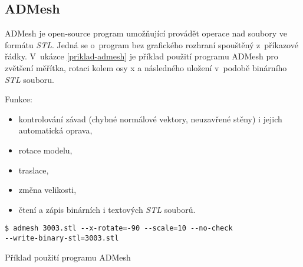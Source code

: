\subsection{ADMesh}
ADMesh \autocite{ADMesh} je open-source program umožňující provádět operace nad soubory ve formátu \textit{\gls{STL}}. Jedná se o~program bez grafického rozhraní spouštěný z~příkazové řádky. V~ukázce \ref{priklad-admesh} je příklad použití programu ADMesh pro zvětšení měřítka, rotaci kolem osy x a následného uložení v~podobě binárního \textit{\gls{STL}} souboru.

Funkce:
\begin{itemize}
    \item kontrolování závad (chybné normálové vektory, neuzavřené stěny) i jejich automatická oprava,
    \item rotace modelu,
    \item traslace,
    \item změna velikosti,
    \item čtení a zápis binárních i textových \textit{\gls{STL}} souborů.
\end{itemize}

\begin{listing}[htbp]
        \begin{verbatim}
$ admesh 3003.stl --x-rotate=-90 --scale=10 --no-check
--write-binary-stl=3003.stl
        \end{verbatim}
    \caption{Příklad použití programu ADMesh \label{priklad-admesh}}
\end{listing}
